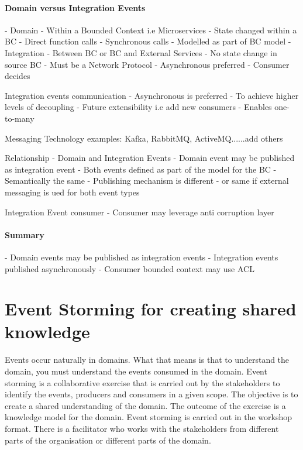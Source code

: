 \documentclass[a4paper, 11pt]{book}
\begin{document}
    \subsubsection{Domain versus Integration Events}
    - Domain
    - Within a Bounded Context i.e Microservices
    - State changed within a BC
    - Direct function calls
    - Synchronous calls
    - Modelled as part of BC model
    - Integration
    - Between BC or BC and External Services
    - No state change in source BC
    - Must be a Network Protocol
    - Asynchronous preferred
    - Consumer decides

    Integration events communication
    - Asynchronous is preferred
    - To achieve higher levels of decoupling
    - Future extensibility i.e add new consumers
    - Enables one-to-many

    Messaging Technology examples: Kafka, RabbitMQ, ActiveMQ......add others

    Relationship - Domain and Integration Events
    - Domain event may be published as integration event
    - Both events defined as part of the model for the BC
    - Semantically the same
    - Publishing mechanism is different - or same if external messaging is ued for both event types

    Integration Event consumer
    - Consumer may leverage anti corruption layer

    \subsubsection{Summary}
    - Domain events may be published as integration events
    - Integration events published asynchronously
    - Consumer bounded context may use ACL


    \chapter{Event Storming for creating shared knowledge}

    Events occur naturally in domains.
    What that means is that to understand the domain, you must understand the events consumed in the domain.
    Event storming is a collaborative exercise that is carried out by the stakeholders to identify the events, producers and consumers in a given scope.
    The objective is to create a shared understanding of the domain.
    The outcome of the exercise is a knowledge model for the domain.
    Event storming is carried out in the workshop format.
    There is a facilitator who works with the stakeholders from different parts of the organisation or different parts of the domain.
\end{document}
